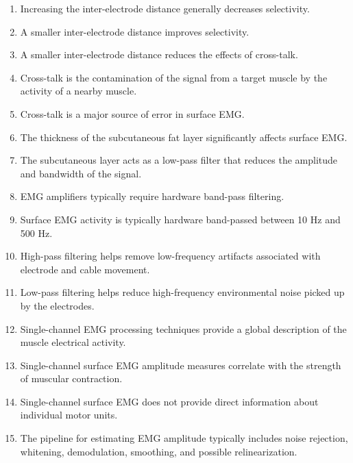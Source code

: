 \begin{enumerate}[label=\arabic*.]
    \item Increasing the inter-electrode distance generally decreases selectivity.
    
    \item A smaller inter-electrode distance improves selectivity.
    
    \item A smaller inter-electrode distance reduces the effects of cross-talk.
    
    \item Cross-talk is the contamination of the signal from a target muscle by the activity of a nearby muscle.
    
    \item Cross-talk is a major source of error in surface EMG.
    
    \item The thickness of the subcutaneous fat layer significantly affects surface EMG.
    
    \item The subcutaneous layer acts as a low-pass filter that reduces the amplitude and bandwidth of the signal.
    
    \item EMG amplifiers typically require hardware band-pass filtering.
    
    \item Surface EMG activity is typically hardware band-passed between 10 Hz and 500 Hz.
    
    \item High-pass filtering helps remove low-frequency artifacts associated with electrode and cable movement.
    
    \item Low-pass filtering helps reduce high-frequency environmental noise picked up by the electrodes.
    
    \item Single-channel EMG processing techniques provide a global description of the muscle electrical activity.
    
    \item Single-channel surface EMG amplitude measures correlate with the strength of muscular contraction.
    
    \item Single-channel surface EMG does not provide direct information about individual motor units.
    
    \item The pipeline for estimating EMG amplitude typically includes noise rejection, whitening, demodulation, smoothing, and possible relinearization.
    

\end{enumerate}
